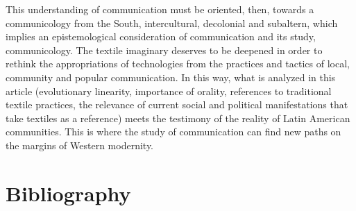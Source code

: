 \documentclass{tufte-handout}
\begin{document}
This understanding of communication must be oriented, then, towards a
communicology from the South, intercultural, decolonial and subaltern,
which implies an epistemological consideration of communication and its
study, communicology. The textile imaginary deserves to be deepened in
order to rethink the appropriations of technologies from the practices
and tactics of local, community and popular communication. In this way,
what is analyzed in this article (evolutionary linearity, importance of
orality, references to traditional textile practices, the relevance of
current social and political manifestations that take textiles as a
reference) meets the testimony of the reality of Latin American
communities. This is where the study of communication can find new paths
on the margins of Western modernity.




\section{Bibliography}\label{bibliography}
\end{document}
